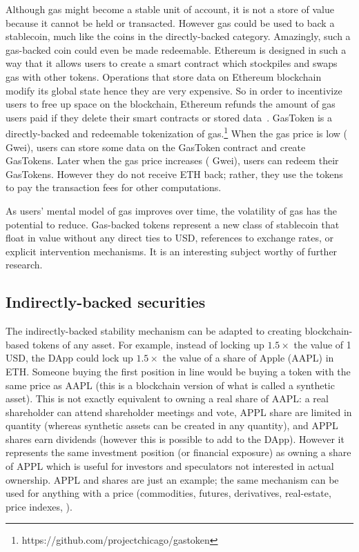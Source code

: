 Although gas might become a stable unit of account, it is not a store of value because it cannot be held or transacted. However gas could be used to back a stablecoin, much like the coins in the directly-backed category. Amazingly, such a gas-backed coin could even be made redeemable. Ethereum is designed in such a way that it allows users to create a smart contract which stockpiles and swaps gas with other tokens. Operations that store data on Ethereum blockchain modify its global state hence they are very expensive. So in order to incentivize users to free up space on the blockchain, Ethereum refunds the amount of gas users paid if they delete their smart contracts or stored data~\cite{wood2014ethereum}. GasToken is a directly-backed and redeemable tokenization of gas.\footnote{https://github.com/projectchicago/gastoken} When the gas price is low ( Gwei), users can store some data on the GasToken contract and create GasTokens. Later when the gas price increases ( Gwei), users can redeem their GasTokens. However they do not receive ETH back; rather, they use the tokens to pay the transaction fees for other computations. 

As users' mental model of gas improves over time, the volatility of gas has the potential to reduce. Gas-backed tokens represent a new class of stablecoin that float in value without any direct ties to USD, references to exchange rates, or explicit intervention mechanisms. It is an interesting subject worthy of further research. 


\subsection{Indirectly-backed securities}

The indirectly-backed stability mechanism can be adapted to creating blockchain-based tokens of any asset. For example, instead of locking up $1.5\times$ the value of 1 USD, the DApp could lock up $1.5\times$ the value of a share of Apple (AAPL) in ETH. Someone buying the first position in line would be buying a token with the same price as AAPL (this is a blockchain version of what is called a synthetic asset). This is not exactly equivalent to owning a real share of AAPL: a real shareholder can attend shareholder meetings and vote, APPL share are limited in quantity (whereas synthetic assets can be created in any quantity), and APPL shares earn dividends (however this is possible to add to the DApp). However it represents the same investment position (or financial exposure) as owning a share of APPL which is useful for investors and speculators not interested in actual ownership. APPL and shares are just an example; the same mechanism can be used for anything with a price (\eg commodities, futures, derivatives, real-estate, price indexes, \etc).

